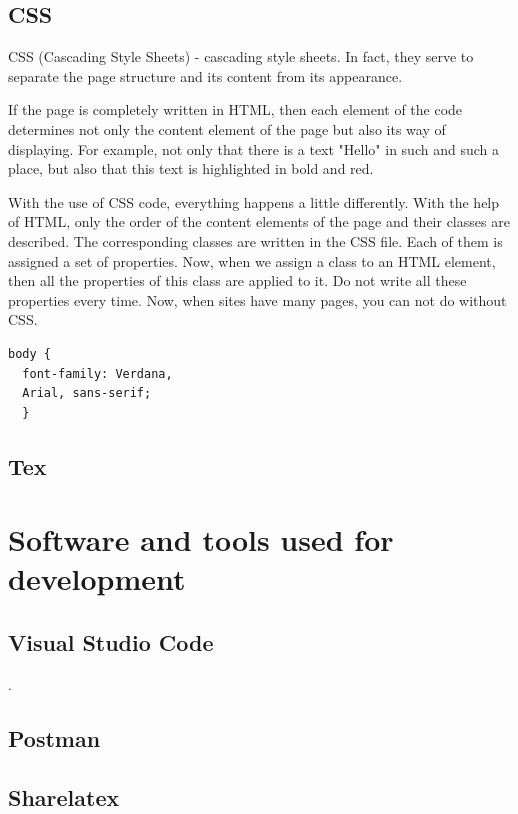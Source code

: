 \subsection{CSS}
CSS (Cascading Style Sheets) - cascading style sheets. In fact, they serve to separate the page structure and its content from its appearance.\par If the page is completely written in HTML, then each element of the code determines not only the content element of the page but also its way of displaying. For example, not only that there is a text "Hello" in such and such a place, but also that this text is highlighted in bold and red.\par With the use of CSS code, everything happens a little differently. With the help of HTML, only the order of the content elements of the page and their classes are described. The corresponding classes are written in the CSS file. Each of them is assigned a set of properties. Now, when we assign a class to an HTML element, then all the properties of this class are applied to it. Do not write all these properties every time. Now, when sites have many pages, you can not do without CSS. \cite{CSS}

\begin{verbatim}
body {
  font-family: Verdana, 
  Arial, sans-serif;
  }
\end{verbatim}

\subsection{Tex}

\section{Software and tools used for development}

\subsection{Visual Studio Code}
\cite{VSCode}.

\subsection{Postman}

\subsection{Sharelatex}

